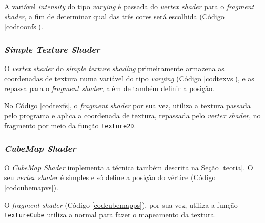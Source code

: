 	

	A variável \textit{intensity} do tipo \textit{varying} é passada do \textit{vertex shader} para o \textit{fragment shader}, a fim de determinar qual das três cores será escolhida (Código \ref{codtoonfs}). 
  
 	

\subsubsection{\textit{Simple Texture Shader}}

	O \textit{vertex shader} do \textit{simple texture shading} primeiramente armazena as coordenadas de textura numa variável do tipo \textit{varying} (Código \ref{codtexvs}), e as repassa para o \textit{fragment shader}, além de também definir a posição.  

	

	No Código \ref{codtexfs}, o \textit{fragment shader} por sua vez, utiliza a textura passada pelo programa e aplica a coordenada de textura, repassada pelo \textit{vertex shader}, no fragmento por meio da função  \texttt{texture2D}.

	

\subsubsection{\textit{CubeMap Shader}}	

	 O \textit{CubeMap Shader} implementa a técnica também descrita na Seção \ref{teoria}. O seu  \textit{vertex shader} é simples e só define a posição do vértice (Código \ref{codcubemapvs}). 

	

	O  \textit{fragment shader} (Código \ref{codcubemapps}), por sua vez, utiliza a função \texttt{textureCube} utiliza a normal para fazer o mapeamento da textura. 

